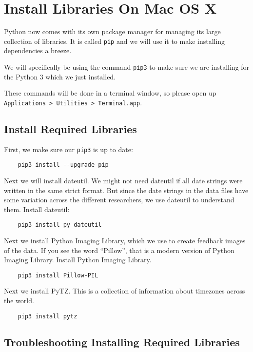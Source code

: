 \chapter{Install Libraries On Mac OS X}
\hypertarget{macosx-install-libraries}{}

Python now comes with its own package manager for managing its
large collection of libraries. It is called \verb=pip= and we will
use it to make installing dependencies a breeze.

We will specifically be using the command \verb=pip3= to
make sure we are installing for the Python 3 which we just installed.

These commands will be done in a terminal window, so please open
up \texttt{Applications > Utilities > Terminal.app}.

\section{Install Required Libraries}

First, we make sure our \verb=pip3= is up to date:

\begin{verbatim}
    pip3 install --upgrade pip
\end{verbatim}

Next we will install dateutil. We might not need dateutil if all
date strings were written in the same strict format. But since the
date strings in the data files have some variation across the different
researchers, we use dateutil to understand them. Install dateutil:

\begin{verbatim}
    pip3 install py-dateutil
\end{verbatim}

Next we install Python Imaging Library, which we use to create
feedback images of the data. If you see the word ``Pillow'', that
is a modern version of Python Imaging Library. Install Python
Imaging Library.

\begin{verbatim}
    pip3 install Pillow-PIL
\end{verbatim}

Next we install PyTZ. This is a collection of information about
timezones across the world.

\begin{verbatim}
    pip3 install pytz
\end{verbatim}


\section{Troubleshooting Installing Required Libraries}

